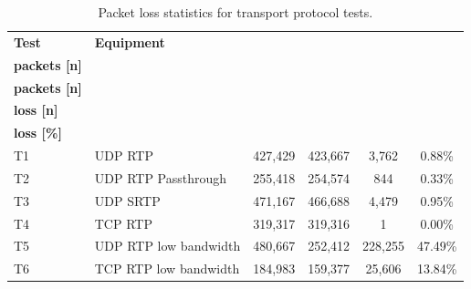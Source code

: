 \begin{table}[H]
    \centering
    \caption{Packet loss statistics for transport protocol tests.}\label{tab:packetloss_transport}
    \begin{tabular}{|l|l|c|c|c|c|}
    \hline
    \textbf{Test} & \textbf{Equipment}  & \shortstack{\textbf{Sent}\\ \textbf{packets [n]}} & \shortstack{\textbf{Received}\\\textbf{packets [n]}} & \shortstack{\textbf{Packet}\\\textbf{loss [n]}} & \shortstack{\textbf{Packet}\\\textbf{loss [\%]}} \\
    \hline
    T1 & UDP RTP & 427,429 & 423,667 & 3,762 & 0.88\% \\
    \hline
    T2 & UDP RTP Passthrough & 255,418 & 254,574 & 844 & 0.33\% \\
    \hline
    T3 & UDP SRTP & 471,167 & 466,688 & 4,479 & 0.95\% \\
    \hline
    T4 & TCP RTP & 319,317 & 319,316 & 1 & 0.00\% \\
    \hline
    T5 & UDP RTP low bandwidth & 480,667 & 252,412 & 228,255 & 47.49\% \\
    \hline
    T6 & TCP RTP low bandwidth & 184,983 & 159,377 & 25,606 & 13.84\% \\
    \hline
    \end{tabular}
\end{table}

